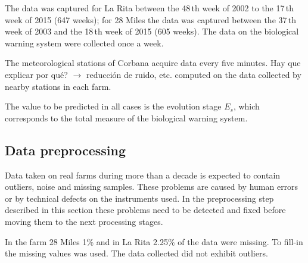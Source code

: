 The data was captured for La Rita between the 48\,th week of
2002 to the 17\,th week of 2015 (647 weeks); for 28 Miles the
data was captured between the 37\,th week of 2003 and the
18\,th week of 2015 (605 weeks).
%
The data on the biological warning system were collected once a
week.

The meteorological stations of Corbana acquire data every five
minutes.
%
{Hay que explicar por qué? $\rightarrow$ reducción de ruido, etc.}
%
computed on the data collected by nearby stations in each farm.




The value to be predicted in all cases is the evolution stage $E_s$,
which corresponds to the total measure of the biological warning
system.

\subsection{Data preprocessing}

Data taken on real farms during more than a decade is expected to
contain outliers, noise and missing samples.  These problems are
caused by human errors or by technical defects on the instruments
used.  
%
In the preprocessing step described in this section these problems
need to be detected and fixed before moving them to the next
processing stages.

In the farm 28 Miles 1\% and in La Rita 2.25\% of the data were missing.
%
To fill-in the missing values  was used.
%
The data collected did not exhibit outliers.

